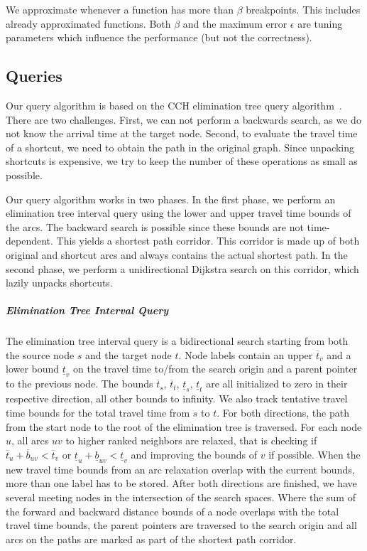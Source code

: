 \documentclass[a4paper,UKenglish,cleveref,autoref]{lipics-v2019}
\begin{document}
We approximate whenever a function has more than $\beta$ breakpoints. %
This includes already approximated functions.
Both $\beta$ and the maximum error $\epsilon$ are tuning parameters which influence the performance (but not the correctness).

\subsection{Queries}

Our query algorithm is based on the CCH elimination tree query algorithm~\cite{dsw-cch-15}.
There are two challenges.
First, we can not perform a backwards search, as we do not know the arrival time at the target node.
Second, to evaluate the travel time of a shortcut, we need to obtain the path in the original graph.
Since unpacking shortcuts is expensive, we try to keep the number of these operations as small as possible.

Our query algorithm works in two phases.
In the first phase, we perform an elimination tree interval query using the lower and upper travel time bounds of the arcs.
The backward search is possible since these bounds are not time-dependent.
This yields a shortest path corridor.
This corridor is made up of both original and shortcut arcs and always contains the actual shortest path.
In the second phase, we perform a unidirectional Dijkstra search on this corridor, which lazily unpacks shortcuts.

\subparagraph*{Elimination Tree Interval Query}

The elimination tree interval query is a bidirectional search starting from both the source node $s$ and the target node $t$.
Node labels contain an upper $\overline{t}_v$ and a lower bound $\underline{t}_v$ on the travel time to/from the search origin and a parent pointer to the previous node.
The bounds $\overline{t}_s$, $\overline{t}_t$, $\underline{t}_s$, $\underline{t}_t$ are all initialized to zero in their respective direction, all other bounds to infinity.
We also track tentative travel time bounds for the total travel time from $s$ to $t$.
For both directions, the path from the start node to the root of the elimination tree is traversed.
For each node $u$, all arcs $u v$ to higher ranked neighbors are relaxed, that is checking if $\overline{t}_u + \overline{b}_{u v} < \overline{t}_v$ or $\underline{t}_u + \underline{b}_{u v} < \underline{t}_v$ and improving the bounds of $v$ if possible.
When the new travel time bounds from an arc relaxation overlap with the current bounds, more than one label has to be stored.
After both directions are finished, we have several meeting nodes in the intersection of the search spaces.
Where the sum of the forward and backward distance bounds of a node overlaps with the total travel time bounds, the parent pointers are traversed to the search origin and all arcs on the paths are marked as part of the shortest path corridor.
\end{document}
